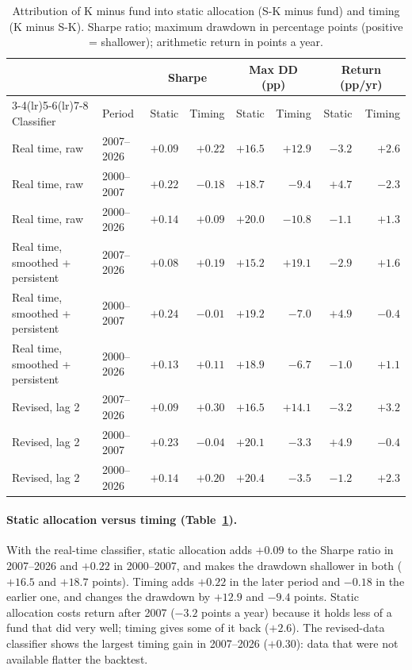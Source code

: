 \documentclass[11pt,a4paper]{article}
\begin{document}
\begin{table}[htbp]
\centering
\caption{Attribution of K minus fund into static allocation (S-K minus fund) and timing (K minus S-K). Sharpe
ratio; maximum drawdown in percentage points (positive = shallower); arithmetic return in points a year.}
\label{tab:attr}
\footnotesize
\setlength{\tabcolsep}{4pt}
\begin{tabular}{@{}llrrrrrr@{}}
\toprule
& & \multicolumn{2}{c}{Sharpe} & \multicolumn{2}{c}{Max DD (pp)} & \multicolumn{2}{c}{Return (pp/yr)} \\
\cmidrule(lr){3-4}\cmidrule(lr){5-6}\cmidrule(lr){7-8}
Classifier & Period & Static & Timing & Static & Timing & Static & Timing \\
\midrule
Real time, raw & 2007--2026 & $+0.09$ & $+0.22$ & $+16.5$ & $+12.9$ & $-3.2$ & $+2.6$ \\
Real time, raw & 2000--2007 & $+0.22$ & $-0.18$ & $+18.7$ & $-9.4$ & $+4.7$ & $-2.3$ \\
Real time, raw & 2000--2026 & $+0.14$ & $+0.09$ & $+20.0$ & $-10.8$ & $-1.1$ & $+1.3$ \\
\midrule
Real time, smoothed + persistent & 2007--2026 & $+0.08$ & $+0.19$ & $+15.2$ & $+19.1$ & $-2.9$ & $+1.6$ \\
Real time, smoothed + persistent & 2000--2007 & $+0.24$ & $-0.01$ & $+19.2$ & $-7.0$ & $+4.9$ & $-0.4$ \\
Real time, smoothed + persistent & 2000--2026 & $+0.13$ & $+0.11$ & $+18.9$ & $-6.7$ & $-1.0$ & $+1.1$ \\
\midrule
Revised, lag 2 & 2007--2026 & $+0.09$ & $+0.30$ & $+16.5$ & $+14.1$ & $-3.2$ & $+3.2$ \\
Revised, lag 2 & 2000--2007 & $+0.23$ & $-0.04$ & $+20.1$ & $-3.3$ & $+4.9$ & $-0.4$ \\
Revised, lag 2 & 2000--2026 & $+0.14$ & $+0.20$ & $+20.4$ & $-3.5$ & $-1.2$ & $+2.3$ \\
\bottomrule
\end{tabular}
\end{table}

\paragraph{Static allocation versus timing (Table~\ref{tab:attr}).} With the real-time classifier, static
allocation adds $+0.09$ to the Sharpe ratio in 2007--2026 and $+0.22$ in 2000--2007, and makes the
drawdown shallower in both ($+16.5$ and $+18.7$ points). Timing adds $+0.22$ in the later period
and $-0.18$ in the earlier one, and changes the drawdown by $+12.9$ and $-9.4$ points. Static
allocation costs return after 2007 ($-3.2$ points a year) because it holds less of a fund that did very
well; timing gives some of it back ($+2.6$). The revised-data classifier shows the largest timing gain in
2007--2026 ($+0.30$): data that were not available flatter the backtest.
\end{document}

